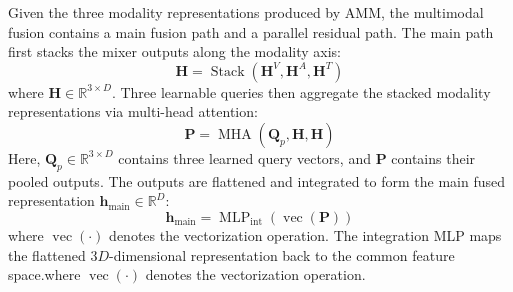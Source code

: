 \documentclass[letterpaper]{article} %
\begin{document}
Given the three modality representations produced by AMM, the
multimodal fusion contains a main fusion path and a parallel
residual path. The main path first stacks the mixer outputs along the
modality axis:
\begin{equation}
\mathbf{H}
=\operatorname{Stack}
  (\mathbf{H}^{V},
   \mathbf{H}^{A},
   \mathbf{H}^{T})
\label{eq:stacked_mixer_output}
\end{equation}
where $\mathbf{H}\in\mathbb{R}^{3\times D}$. Three learnable queries then aggregate the stacked modality representations via multi-head attention:
\begin{equation}
\mathbf{P}
=\operatorname{MHA}
  (\mathbf{Q}_{p},\mathbf{H},
   \mathbf{H})
\end{equation}
Here, $\mathbf{Q}_{p}\in\mathbb{R}^{3\times D}$ contains three learned
query vectors, and $\mathbf{P}$ contains their pooled outputs. The
outputs are flattened and integrated to form the main fused
representation $\mathbf{h}_{\mathrm{main}}\in\mathbb{R}^{D}$:
\begin{equation}
\mathbf{h}_{\mathrm{main}}
=\operatorname{MLP}_{\mathrm{int}}
  (\operatorname{vec}(\mathbf{P}))
\label{eq:main_fusion}
\end{equation}
where $\operatorname{vec}(\cdot)$ denotes the vectorization operation.
The integration MLP maps the flattened $3D$-dimensional representation
back to the common feature space.where $\operatorname{vec}(\cdot)$ denotes the vectorization operation.
\end{document}
